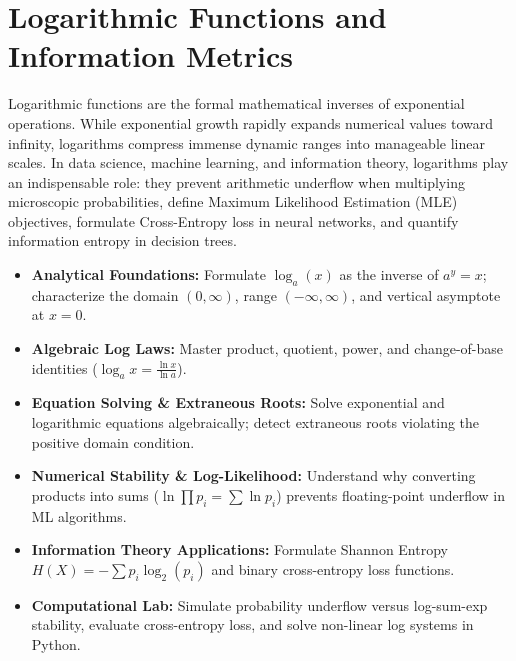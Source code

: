 \chapter{Logarithmic Functions and Information Metrics}

Logarithmic functions are the formal mathematical inverses of exponential operations. While exponential growth rapidly expands numerical values toward infinity, logarithms compress immense dynamic ranges into manageable linear scales. In data science, machine learning, and information theory, logarithms play an indispensable role: they prevent arithmetic underflow when multiplying microscopic probabilities, define Maximum Likelihood Estimation (MLE) objectives, formulate Cross-Entropy loss in neural networks, and quantify information entropy in decision trees.

\vspace{0.3cm}
\begin{tcolorbox}[colback=primarylight, colframe=primarydark, title={\textbf{Executive Roadmap \& Learning Objectives}}]
\begin{itemize}
    \item \textbf{Analytical Foundations:} Formulate $\log_a(x)$ as the inverse of $a^y = x$; characterize the domain $(0, \infty)$, range $(-\infty, \infty)$, and vertical asymptote at $x = 0$.
    \item \textbf{Algebraic Log Laws:} Master product, quotient, power, and change-of-base identities ($\log_a x = \frac{\ln x}{\ln a}$).
    \item \textbf{Equation Solving \& Extraneous Roots:} Solve exponential and logarithmic equations algebraically; detect extraneous roots violating the positive domain condition.
    \item \textbf{Numerical Stability \& Log-Likelihood:} Understand why converting products into sums ($\ln \prod p_i = \sum \ln p_i$) prevents floating-point underflow in ML algorithms.
    \item \textbf{Information Theory Applications:} Formulate Shannon Entropy $H(X) = -\sum p_i \log_2(p_i)$ and binary cross-entropy loss functions.
    \item \textbf{Computational Lab:} Simulate probability underflow versus log-sum-exp stability, evaluate cross-entropy loss, and solve non-linear log systems in Python.
\end{itemize}
\end{tcolorbox}
\vspace{0.3cm}

